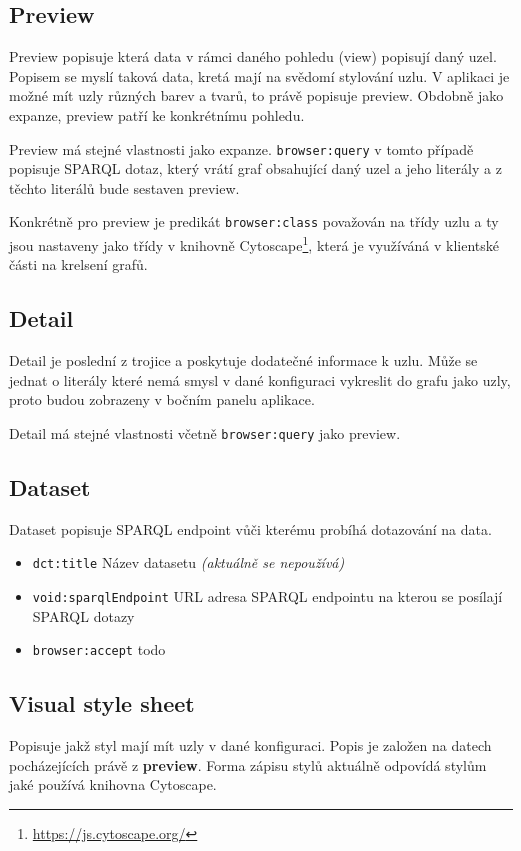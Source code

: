 \subsection{Preview} \label{pozadavky-preview}
Preview popisuje která data v rámci daného pohledu (view) popisují daný uzel. Popisem se myslí taková data, kretá mají na svědomí stylování uzlu. V aplikaci je možné mít uzly různých barev a tvarů, to právě popisuje preview. Obdobně jako expanze, preview patří ke konkrétnímu pohledu.

Preview má stejné vlastnosti jako expanze. \texttt{browser:query} v tomto případě popisuje SPARQL dotaz, který vrátí graf obsahující daný uzel a jeho literály a z těchto literálů bude sestaven preview.

Konkrétně pro preview je predikát \texttt{browser:class} považován na třídy uzlu a ty jsou nastaveny jako třídy v knihovně Cytoscape\footnote{\url{https://js.cytoscape.org/}}, která je využíváná v klientské části na krelsení grafů.

\subsection{Detail} \label{pozadavky-detail}
Detail je poslední z trojice a poskytuje dodatečné informace k uzlu. Může se jednat o literály které nemá smysl v dané konfiguraci vykreslit do grafu jako uzly, proto budou zobrazeny v bočním panelu aplikace.

Detail má stejné vlastnosti včetně \texttt{browser:query} jako preview.

\subsection{Dataset}
Dataset popisuje SPARQL endpoint vůči kterému probíhá dotazování na data.

\begin{itemize}
    \item \texttt{dct:title} Název datasetu \textit{(aktuálně se nepoužívá)}
    \item \texttt{void:sparqlEndpoint} URL adresa SPARQL endpointu na kterou se posílají SPARQL dotazy
    \item \texttt{browser:accept} todo
\end{itemize}

\subsection{Visual style sheet} \label{pozadavky-visual-style-sheet}
Popisuje jakž styl mají mít uzly v dané konfiguraci. Popis je založen na datech pocházejících právě z \textbf{preview}. Forma zápisu stylů aktuálně odpovídá stylům jaké používá knihovna Cytoscape.

